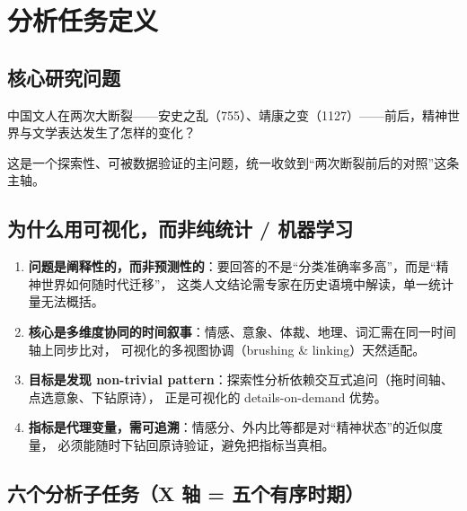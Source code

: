 \section{分析任务定义}

\subsection{核心研究问题}

\begin{keybox}[核心问题]
中国文人在两次大断裂——安史之乱（755）、靖康之变（1127）——前后，精神世界与文学表达发生了怎样的变化？
\end{keybox}

这是一个探索性、可被数据验证的主问题，统一收敛到“两次断裂前后的对照”这条主轴。

\subsection{为什么用可视化，而非纯统计 / 机器学习}

\begin{enumerate}[label=\textbf{\arabic*.}, leftmargin=*, itemsep=0.3em]
    \item \textbf{问题是阐释性的，而非预测性的}：要回答的不是“分类准确率多高”，而是“精神世界如何随时代迁移”，
          这类人文结论需专家在历史语境中解读，单一统计量无法概括。
    \item \textbf{核心是多维度协同的时间叙事}：情感、意象、体裁、地理、词汇需在同一时间轴上同步比对，
          可视化的多视图协调（brushing \& linking）天然适配。
    \item \textbf{目标是发现 non-trivial pattern}：探索性分析依赖交互式追问（拖时间轴、点选意象、下钻原诗），
          正是可视化的 details-on-demand 优势。
    \item \textbf{指标是代理变量，需可追溯}：情感分、外内比等都是对“精神状态”的近似度量，
          必须能随时下钻回原诗验证，避免把指标当真相。
\end{enumerate}

\subsection{六个分析子任务（X 轴 = 五个有序时期）}

